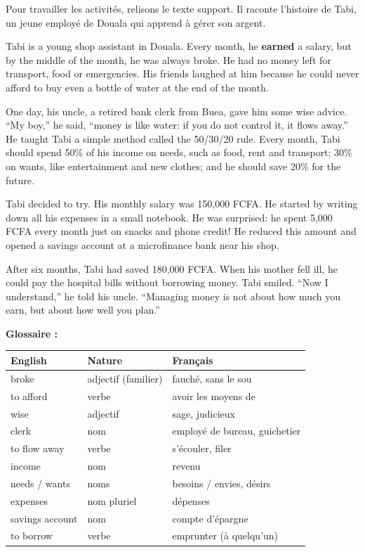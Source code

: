 \documentclass[11pt]{article}
\newcounter{popsec}
\newcounter{popsub}
\newcommand{\courssub}[1]{%
  \stepcounter{popsub}%
  \par\vspace{9pt}\noindent{\popxbold\fontsize{11.5}{13}\selectfont\color{popink}{\color{poporange}\thepopsec.\thepopsub}\hspace{6pt}#1}\par\nopagebreak\vspace{4pt}
}
\begin{document}
\courssub{The reading text: a quick reminder}

Pour travailler les activités, relisons le texte support. Il raconte l'histoire de Tabi, un jeune employé de Douala qui apprend à gérer son argent.

\begin{textebox}
Tabi is a young shop assistant in Douala. Every month, he \textbf{earned} a salary, but by the middle of the month, he was always broke. He had no money left for transport, food or emergencies. His friends laughed at him because he could never afford to buy even a bottle of water at the end of the month.

One day, his uncle, a retired bank clerk from Buea, gave him some wise advice. “My boy,” he said, “money is like water: if you do not control it, it flows away.” He taught Tabi a simple method called the 50/30/20 rule. Every month, Tabi should spend 50\% of his income on needs, such as food, rent and transport; 30\% on wants, like entertainment and new clothes; and he should save 20\% for the future.

Tabi decided to try. His monthly salary was 150,000 FCFA. He started by writing down all his expenses in a small notebook. He was surprised: he spent 5,000 FCFA every month just on snacks and phone credit! He reduced this amount and opened a savings account at a microfinance bank near his shop.

After six months, Tabi had saved 180,000 FCFA. When his mother fell ill, he could pay the hospital bills without borrowing money. Tabi smiled. “Now I understand,” he told his uncle. “Managing money is not about how much you earn, but about how well you plan.”
\end{textebox}

\textbf{Glossaire :}

\begin{center}
\begin{tabularx}{\linewidth}{|l|l|X|}
\hline
\rowcolor{popblueL} \textbf{English} & \textbf{Nature} & \textbf{Français} \\
\hline
broke & adjectif (familier) & fauché, sans le sou \\
\hline
to afford & verbe & avoir les moyens de \\
\hline
wise & adjectif & sage, judicieux \\
\hline
clerk & nom & employé de bureau, guichetier \\
\hline
to flow away & verbe & s'écouler, filer \\
\hline
income & nom & revenu \\
\hline
needs / wants & noms & besoins / envies, désirs \\
\hline
expenses & nom pluriel & dépenses \\
\hline
savings account & nom & compte d'épargne \\
\hline
to borrow & verbe & emprunter (à quelqu'un) \\
\hline
\end{tabularx}
\end{center}
\end{document}
